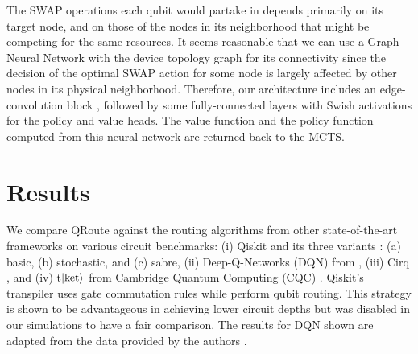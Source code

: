 
The SWAP operations each qubit would partake in depends primarily on its target node, and on those of the nodes in its neighborhood that might be competing for the same resources. It seems reasonable that we can use a Graph Neural Network with the device topology graph for its connectivity since the decision of the optimal SWAP action for some node is largely affected by other nodes in its physical neighborhood. Therefore, our architecture includes an edge-convolution block \cite{nn_edge_conv}, followed by some fully-connected layers with Swish \cite{nn_swish} activations for the policy and value heads. The value function and the policy function computed from this neural network are returned back to the MCTS.



\section{\label{sec:results}Results}
We compare QRoute against the routing algorithms from other state-of-the-art frameworks on various circuit benchmarks: (i) Qiskit and its three variants \cite{comp_qiskit}: (a) basic, (b) stochastic, and (c) sabre, (ii) Deep-Q-Networks (DQN) from \cite{qroute_dqn2}, (iii) Cirq \cite{comp_cirq}, and (iv) t$\ket{\text{ket}}$ from Cambridge Quantum Computing (CQC) \cite{comp_pytket}. 
Qiskit's transpiler uses gate commutation rules while perform qubit routing. This strategy is shown to be advantageous in achieving lower circuit depths \cite{bridge_gate} but was disabled in our simulations to have a fair comparison. The results for DQN shown are adapted from the data provided by the authors \cite{qroute_dqn2}.

